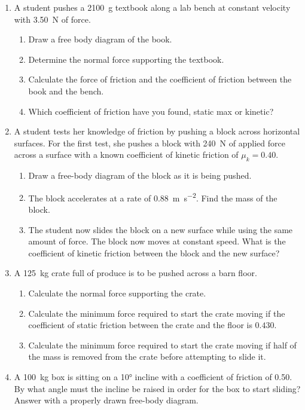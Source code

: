 \begin{enumerate}[itemsep=6pt]
\item A student pushes a \SI{2100}{\gram} textbook along a lab bench at
  constant velocity with \SI{3.50}{\newton} of force. 
  \begin{enumerate}[itemsep=3pt]
  \item Draw a free body diagram of the book.
  \item Determine the normal force supporting the textbook.
  \item Calculate the force of friction and the coefficient of friction between
    the book and the bench.
  \item Which coefficient of friction have you found, static max or kinetic?
  \end{enumerate}
  
\item A student tests her knowledge of friction by pushing a block across
  horizontal surfaces. For the first test, she pushes a block with
  \SI{240}{\newton} of applied force across a surface with a known coefficient
  of kinetic friction of $\mu_k=0.40$.
  \begin{enumerate}[itemsep=3pt]
  \item Draw a free-body diagram of the block as it is being pushed.
  \item The block accelerates at a rate of
    \SI{.88}{\metre\per\second\squared}. Find the mass of the block.
  \item The student now slides the block on a new surface while using the same
    amount of force. The block now moves at constant speed. What is the
    coefficient of kinetic friction between the block and the new surface?
  \end{enumerate}
  
\item A \SI{125}{\kilo\gram} crate full of produce is to be pushed across a
  barn floor.
  \begin{enumerate}[itemsep=3pt]
  \item Calculate the normal force supporting the crate.
  \item Calculate the minimum force required to start the crate moving if the
    coefficient of static friction between the crate and the floor is $0.430$.
  \item Calculate the minimum force required to start the crate moving if half
    of the mass is removed from the crate before attempting to slide it.
  \end{enumerate}

\item A \SI{100}{\kilo\gram} box is sitting on a \ang{10} incline with a
  coefficient of friction of 0.50. By what angle must the incline be raised in
  order for the box to start sliding? Answer with a properly drawn free-body
  diagram.
    

\end{enumerate}
